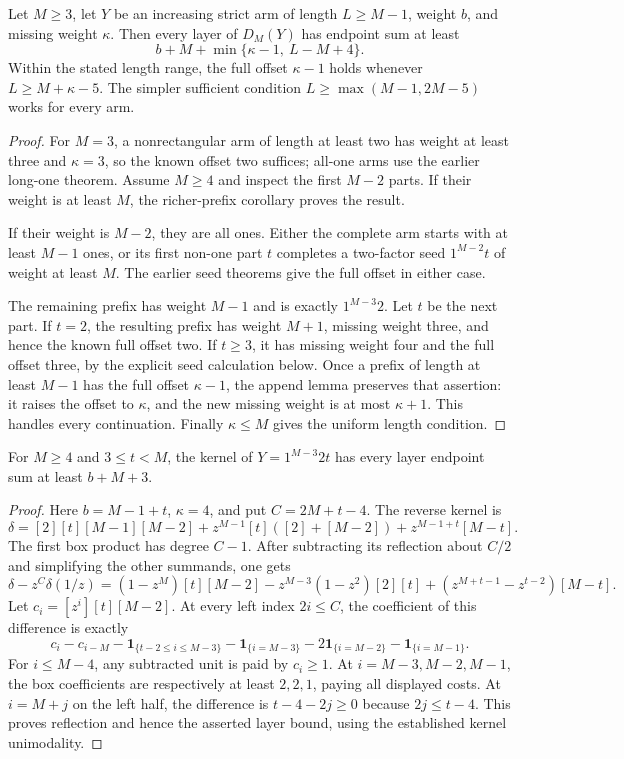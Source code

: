 \begin{theorem}
Let $M\ge3$, let $Y$ be an increasing strict arm of length
$L\ge M-1$, weight $b$, and missing weight $\kappa$. Then
every layer of $D_M(Y)$ has endpoint sum at least
\[
 b+M+\min\{\kappa-1,\ L-M+4\}.
\]
Within the stated length range, the full offset $\kappa-1$ holds
whenever $L\ge M+\kappa-5$. The simpler sufficient condition
$L\ge\max(M-1,2M-5)$ works for every arm.
\end{theorem}
\begin{proof}
For $M=3$, a nonrectangular arm of length at least two has weight
at least three and $\kappa=3$, so the known offset two suffices;
all-one arms use the earlier long-one theorem. Assume $M\ge4$
and inspect the first $M-2$ parts. If their weight is at least
$M$, the richer-prefix corollary proves the result.

If their weight is $M-2$, they are all ones. Either the complete
arm starts with at least $M-1$ ones, or its first non-one part
$t$ completes a two-factor seed $1^{M-2}t$ of weight at least
$M$. The earlier seed theorems give the full offset in either case.

The remaining prefix has weight $M-1$ and is exactly
$1^{M-3}2$. Let $t$ be the next part. If $t=2$, the resulting
prefix has weight $M+1$, missing weight three, and hence the
known full offset two. If $t\ge3$, it has missing weight four
and the full offset three, by the explicit seed calculation below.
Once a prefix of length at least $M-1$ has the full offset
$\kappa-1$, the append lemma preserves that assertion:
it raises the offset to $\kappa$, and the new missing weight
is at most $\kappa+1$. This handles every continuation.
Finally $\kappa\le M$ gives the uniform length condition.
\end{proof}

\begin{lemma}
For $M\ge4$ and $3\le t<M$, the kernel of
$Y=1^{M-3}2t$ has every layer endpoint sum at least $b+M+3$.
\end{lemma}
\begin{proof}
Here $b=M-1+t$, $\kappa=4$, and put $C=2M+t-4$.
The reverse kernel is
\[
 \delta=[2][t][M-1][M-2]
       +z^{M-1}[t]([2]+[M-2])
       +z^{M-1+t}[M-t].
\]
The first box product has degree $C-1$. After subtracting its
reflection about $C/2$ and simplifying the other summands, one gets
\[
 \delta-z^C\delta(1/z)
 =(1-z^M)[t][M-2]
 -z^{M-3}(1-z^2)[2][t]
 +(z^{M+t-1}-z^{t-2})[M-t].
\]
Let $c_i=[z^i][t][M-2]$. At every left index $2i\le C$, the
coefficient of this difference is exactly
\[
 c_i-c_{i-M}
 -\mathbf1_{\{t-2\le i\le M-3\}}
 -\mathbf1_{\{i=M-3\}}
 -2\mathbf1_{\{i=M-2\}}
 -\mathbf1_{\{i=M-1\}}.
\]
For $i\le M-4$, any subtracted unit is paid by $c_i\ge1$.
At $i=M-3,M-2,M-1$, the box coefficients are respectively
at least $2,2,1$, paying all displayed costs. At $i=M+j$
on the left half, the difference is $t-4-2j\ge0$ because
$2j\le t-4$. This proves reflection and hence the asserted
layer bound, using the established kernel unimodality.
\end{proof}

